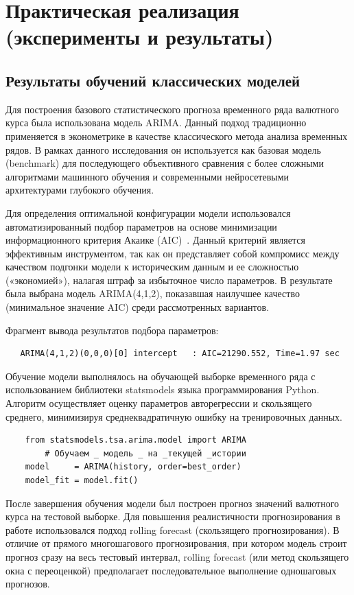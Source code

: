\chapter{Практическая реализация (эксперименты и результаты)}

\section{Результаты обучений классических моделей}
Для построения базового статистического прогноза временного ряда валютного курса была использована модель ARIMA. Данный подход традиционно применяется в эконометрике в качестве классического метода анализа временных рядов. В рамках данного исследования он используется как базовая модель (benchmark) для последующего объективного сравнения с более сложными алгоритмами машинного обучения и современными нейросетевыми архитектурами глубокого обучения.

Для определения оптимальной конфигурации модели использовался автоматизированный подбор параметров на основе минимизации информационного критерия Акаике (AIC)~\cite{hyndman2021}. Данный критерий является эффективным инструментом, так как он представляет собой компромисс между качеством подгонки модели к историческим данным и ее сложностью («экономией»), налагая штраф за избыточное число параметров. В результате была выбрана модель ARIMA(4,1,2), показавшая наилучшее качество (минимальное значение AIC) среди рассмотренных вариантов.

Фрагмент вывода результатов подбора параметров:
\begin{lstlisting}
   ARIMA(4,1,2)(0,0,0)[0] intercept   : AIC=21290.552, Time=1.97 sec 
\end{lstlisting}
 

Обучение модели выполнялось на обучающей выборке временного ряда с использованием библиотеки statsmodels языка программирования Python. Алгоритм осуществляет оценку параметров авторегрессии и скользящего среднего, минимизируя среднеквадратичную ошибку на тренировочных данных.
\begin{lstlisting}
    from statsmodels.tsa.arima.model import ARIMA
        # Обучаем _ модель _ на _текущей _истории
    model     = ARIMA(history, order=best_order)
    model_fit = model.fit()
\end{lstlisting}

После завершения обучения модели был построен прогноз значений валютного курса на тестовой выборке. Для повышения реалистичности прогнозирования в работе использовался подход rolling forecast (скользящего прогнозирования). В отличие от прямого многошагового прогнозирования, при котором модель строит прогноз сразу на весь тестовый интервал, rolling forecast (или метод скользящего окна с переоценкой) предполагает последовательное выполнение одношаговых прогнозов.

